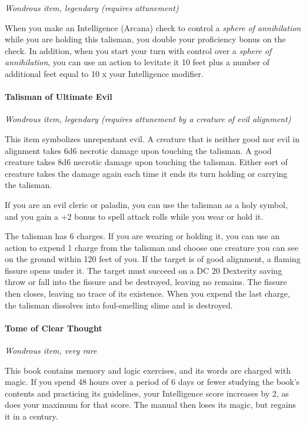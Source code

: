 \documentclass[
]{article}
\begin{document}
\emph{Wondrous item, legendary (requires attunement)}

When you make an Intelligence (Arcana) check to control a \emph{sphere
of annihilation} while you are holding this talisman, you double your
proficiency bonus on the check. In addition, when you start your turn
with control over a \emph{sphere of annihilation}, you can use an action
to levitate it 10 feet plus a number of additional feet equal to 10 x
your Intelligence modifier.

\hypertarget{talisman-of-ultimate-evil}{%
\paragraph{Talisman of Ultimate Evil}\label{talisman-of-ultimate-evil}}

\emph{Wondrous item, legendary (requires attunement by a creature of
evil alignment)}

This item symbolizes unrepentant evil. A creature that is neither good
nor evil in alignment takes 6d6 necrotic damage upon touching the
talisman. A good creature takes 8d6 necrotic damage upon touching the
talisman. Either sort of creature takes the damage again each time it
ends its turn holding or carrying the talisman.

If you are an evil cleric or paladin, you can use the talisman as a holy
symbol, and you gain a +2 bonus to spell attack rolls while you wear or
hold it.

The talisman has 6 charges. If you are wearing or holding it, you can
use an action to expend 1 charge from the talisman and choose one
creature you can see on the ground within 120 feet of you. If the target
is of good alignment, a flaming fissure opens under it. The target must
succeed on a DC 20 Dexterity saving throw or fall into the fissure and
be destroyed, leaving no remains. The fissure then closes, leaving no
trace of its existence. When you expend the last charge, the talisman
dissolves into foul-smelling slime and is destroyed.

\hypertarget{tome-of-clear-thought}{%
\paragraph{Tome of Clear Thought}\label{tome-of-clear-thought}}

\emph{Wondrous item, very rare}

This book contains memory and logic exercises, and its words are charged
with magic. If you spend 48 hours over a period of 6 days or fewer
studying the book's contents and practicing its guidelines, your
Intelligence score increases by 2, as does your maximum for that score.
The manual then loses its magic, but regains it in a century.
\end{document}
